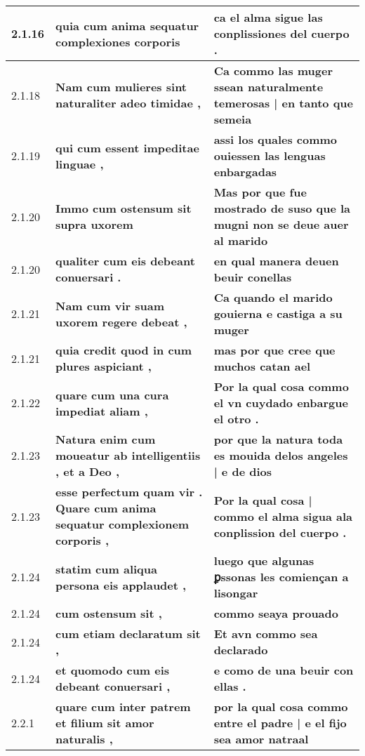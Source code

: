 \begin{tabular}{|p{1cm}|p{6.5cm}|p{6.5cm}|}
2.1.16 &  \textbf{ quia cum anima sequatur complexiones corporis }  &  \textbf{ ca el alma sigue las conplissiones del cuerpo . }  \\\hline
2.1.18 &  \textbf{ Nam cum mulieres sint naturaliter adeo timidae , }  &  \textbf{ Ca commo las muger ssean naturalmente temerosas | en tanto que semeia }  \\\hline
2.1.19 &  \textbf{ qui cum essent impeditae linguae , }  &  \textbf{ assi los quales commo ouiessen las lenguas enbargadas }  \\\hline
2.1.20 &  \textbf{ Immo cum ostensum sit supra uxorem }  &  \textbf{ Mas por que fue mostrado de suso que la mugni non se deue auer al marido }  \\\hline
2.1.20 &  \textbf{ qualiter cum eis debeant conuersari . }  &  \textbf{ en qual manera deuen beuir conellas }  \\\hline
2.1.21 &  \textbf{ Nam cum vir suam uxorem regere debeat , }  &  \textbf{ Ca quando el marido gouierna e castiga a su muger }  \\\hline
2.1.21 &  \textbf{ quia credit quod in cum plures aspiciant , }  &  \textbf{ mas por que cree que muchos catan ael }  \\\hline
2.1.22 &  \textbf{ quare cum una cura impediat aliam , }  &  \textbf{ Por la qual cosa commo el vn cuydado enbargue el otro . }  \\\hline
2.1.23 &  \textbf{ Natura enim cum moueatur ab intelligentiis , et a Deo , }  &  \textbf{ por que la natura toda es mouida delos angeles | e de dios }  \\\hline
2.1.23 &  \textbf{ esse perfectum quam vir . Quare cum anima sequatur complexionem corporis , }  &  \textbf{ Por la qual cosa | commo el alma sigua ala conplission del cuerpo . }  \\\hline
2.1.24 &  \textbf{ statim cum aliqua persona eis applaudet , }  &  \textbf{ luego que algunas ꝑssonas les comiençan a lisongar }  \\\hline
2.1.24 &  \textbf{ cum ostensum sit , }  &  \textbf{ commo seaya prouado }  \\\hline
2.1.24 &  \textbf{ cum etiam declaratum sit , }  &  \textbf{ Et avn commo sea declarado }  \\\hline
2.1.24 &  \textbf{ et quomodo cum eis debeant conuersari , }  &  \textbf{ e como de una beuir con ellas . }  \\\hline
2.2.1 &  \textbf{ quare cum inter patrem et filium sit amor naturalis , }  &  \textbf{ por la qual cosa commo entre el padre | e el fijo sea amor natraal }  \\\hline

\end{tabular}
